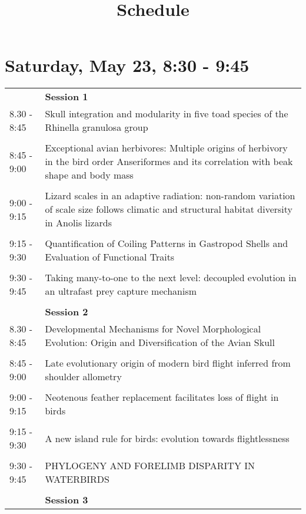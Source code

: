 \documentclass{article}
\title{Schedule}
\date{}
\begin{document}
\maketitle


\section{Saturday, May 23, 8:30 - 9:45}
\begin{longtabu} to \textwidth {lX}
 & \textbf{Session 1} \\ 

8.30 - 8:45 & Skull integration and modularity in five toad species of the Rhinella granulosa group \\ 
 &  \\ 
8:45 - 9:00 & Exceptional avian herbivores: Multiple origins of herbivory in the bird order Anseriformes and its correlation with beak shape and body mass \\ 
 &  \\ 
9:00 - 9:15 & Lizard scales in an adaptive radiation: non-random variation of scale size follows climatic and structural habitat diversity in Anolis lizards \\ 
 &  \\ 
9:15 - 9:30 & Quantification of Coiling Patterns in Gastropod Shells and Evaluation of Functional Traits \\ 
 &  \\ 
9:30 - 9:45 & Taking many-to-one to the next level: decoupled evolution in an ultrafast prey capture mechanism \\ 
 &  \\ 
 & \textbf{Session 2} \\ 

8.30 - 8:45 & Developmental Mechanisms for Novel Morphological Evolution: Origin and Diversification of the Avian Skull \\ 
 &  \\ 
8:45 - 9:00 & Late evolutionary origin of modern bird flight inferred from shoulder allometry \\ 
 &  \\ 
9:00 - 9:15 & Neotenous feather replacement facilitates loss of flight in birds \\ 
 &  \\ 
9:15 - 9:30 & A new island rule for birds: evolution towards flightlessness \\ 
 &  \\ 
9:30 - 9:45 & PHYLOGENY AND FORELIMB DISPARITY IN WATERBIRDS \\ 
 &  \\ 
 & \textbf{Session 3} \\ 


\end{longtabu}
\end{document}

